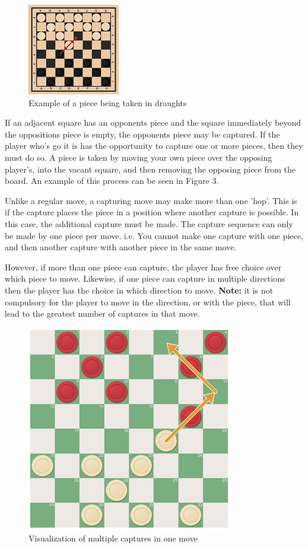 \documentclass{article}
\begin{document}
    \begin{figure}
        \centering
        \includegraphics[scale=1.15]{piece being taken.png}
        \caption{Example of a piece being taken in draughts}
    \end{figure}
    If an adjacent square has an opponents piece and the square immediately beyond the oppositions piece is empty, the opponents piece may be captured.
    If the player who's go it is has the opportunity to capture one or more pieces, then they must do so. 
    A piece is taken by moving your own piece over the opposing player's, into the vacant square, and then removing the opposing piece from the board.
    An example of this process can be seen in Figure 3.

    Unlike a regular move, a capturing move may make more than one 'hop'. This is if the capture places the piece in a position where another capture is possible.
    In this case, the additional capture must be made. The capture sequence can only be made by one piece per move. i.e. You cannot make one capture with one piece, 
    and then another capture with another piece in the same move.
    
    However, if more than one piece can capture, the player has free choice over which piece to move. Likewise, if one piece can capture in multiple
    directions then the player has the choice in which direction to move. \textbf{Note:} it is not compulsory for the player to move in the direction, or with the piece,
    that will lead to the greatest number of captures in that move.
    
    \begin{figure}
        \centering
        \includegraphics[scale=0.8]{double hop.png}
        \caption{Visualization of multiple captures in one move}
    \end{figure}
\end{document}
